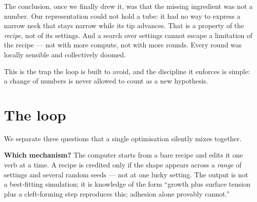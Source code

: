 \documentclass[11pt]{article}
\begin{document}
The conclusion, once we finally drew it, was that the missing ingredient was not a number. Our
representation could not hold a tube: it had no way to express a narrow neck that stays narrow
while its tip advances. That is a property of the \emph{recipe}, not of its settings. And a
search over settings cannot escape a limitation of the recipe --- not with more compute, not
with more rounds. Every round was locally sensible and collectively doomed.

This is the trap the loop is built to avoid, and the discipline it enforces is simple: a change
of numbers is never allowed to count as a new hypothesis.

\section{The loop}

We separate three questions that a single optimisation silently mixes together.

\begin{center}
\end{center}

\textbf{Which mechanism?} The computer starts from a bare recipe and edits it one verb at a
time. A recipe is credited only if the shape appears across a \emph{range} of settings and
several random seeds --- not at one lucky setting. The output is not a best-fitting simulation;
it is knowledge of the form ``growth plus surface tension plus a cleft-forming step reproduces
this; adhesion alone provably cannot.''
\end{document}
